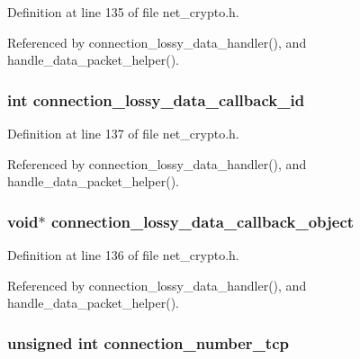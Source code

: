 Definition at line 135 of file net\+\_\+crypto.\+h.



Referenced by connection\+\_\+lossy\+\_\+data\+\_\+handler(), and handle\+\_\+data\+\_\+packet\+\_\+helper().

\hypertarget{struct_crypto___connection_acdd49847729119bc5d6cc7269cde876a}{
\subsubsection[{connection\+\_\+lossy\+\_\+data\+\_\+callback\+\_\+id}]{\setlength{\rightskip}{0pt plus 5cm}int connection\+\_\+lossy\+\_\+data\+\_\+callback\+\_\+id}}\label{struct_crypto___connection_acdd49847729119bc5d6cc7269cde876a}


Definition at line 137 of file net\+\_\+crypto.\+h.



Referenced by connection\+\_\+lossy\+\_\+data\+\_\+handler(), and handle\+\_\+data\+\_\+packet\+\_\+helper().

\hypertarget{struct_crypto___connection_a70a99b7d0c9dd2f913ca9ea42bafc942}{
\subsubsection[{connection\+\_\+lossy\+\_\+data\+\_\+callback\+\_\+object}]{\setlength{\rightskip}{0pt plus 5cm}void$\ast$ connection\+\_\+lossy\+\_\+data\+\_\+callback\+\_\+object}}\label{struct_crypto___connection_a70a99b7d0c9dd2f913ca9ea42bafc942}


Definition at line 136 of file net\+\_\+crypto.\+h.



Referenced by connection\+\_\+lossy\+\_\+data\+\_\+handler(), and handle\+\_\+data\+\_\+packet\+\_\+helper().

\hypertarget{struct_crypto___connection_a51666aaba0fc5680040fe5bd6778bc50}{
\subsubsection[{connection\+\_\+number\+\_\+tcp}]{\setlength{\rightskip}{0pt plus 5cm}unsigned int connection\+\_\+number\+\_\+tcp}}\label{struct_crypto___connection_a51666aaba0fc5680040fe5bd6778bc50}


